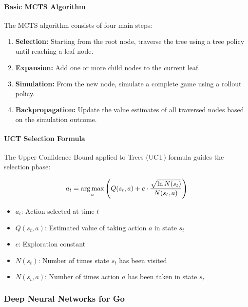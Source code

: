 \documentclass[11pt]{article}
\newcommand{\argmax}{\operatornamewithlimits{arg\,max}}
\begin{document}
\paragraph{Basic MCTS Algorithm}
The MCTS algorithm consists of four main steps:

\begin{enumerate}
    \item \textbf{Selection:} Starting from the root node, traverse the tree using a tree policy until reaching a leaf node.
    \item \textbf{Expansion:} Add one or more child nodes to the current leaf.
    \item \textbf{Simulation:} From the new node, simulate a complete game using a rollout policy.
    \item \textbf{Backpropagation:} Update the value estimates of all traversed nodes based on the simulation outcome.
\end{enumerate}

\paragraph{UCT Selection Formula}
The Upper Confidence Bound applied to Trees (UCT) formula guides the selection phase:

\begin{equation}
    a_t = \argmax_a \left( Q(s_t, a) + c \cdot \frac{\sqrt{\ln N(s_t)}}{N(s_t, a)} \right)
\end{equation}

\begin{tcolorbox}[title=Notation Overview]
\begin{itemize}
    \item $a_t$: Action selected at time $t$
    \item $Q(s_t, a)$: Estimated value of taking action $a$ in state $s_t$
    \item $c$: Exploration constant
    \item $N(s_t)$: Number of times state $s_t$ has been visited
    \item $N(s_t, a)$: Number of times action $a$ has been taken in state $s_t$
\end{itemize}
\end{tcolorbox}

\subsubsection{Deep Neural Networks for Go}
\end{document}
